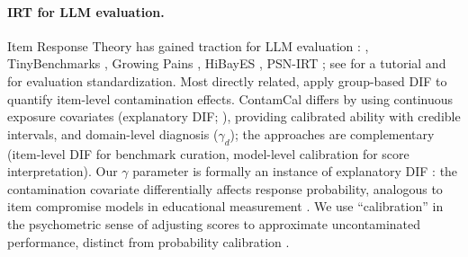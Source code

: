 \paragraph{IRT for LLM evaluation.}
Item Response Theory \citep{lord_1980_irt,hambleton_1991_irt} has gained traction for LLM evaluation \citep{liang_2023_helm}: \citet{rodriguez2021evaluation}, TinyBenchmarks \citep{polo_2024_tinybenchmarks}, Growing Pains \citep{habba_2025_growing_pains}, HiBayES \citep{luettgau_2025_hibayes}, PSN-IRT \citep{zhou_2025_psnirt}; see \citet{lalor_2024_irt_nlp} for a tutorial and \citet{gu2024olmes} for evaluation standardization. Most directly related, \citet{han2026quantifying} apply group-based DIF \citep{holland_1993_dif} to quantify item-level contamination effects. ContamCal differs by using continuous exposure covariates (explanatory DIF; \citealp{deboeck_2004_explanatory_irt}), providing calibrated ability with credible intervals, and domain-level diagnosis ($\gamma_d$); the approaches are complementary (item-level DIF for benchmark curation, model-level calibration for score interpretation). Our $\gamma$ parameter is formally an instance of explanatory DIF \citep{deboeck_2004_explanatory_irt,eckerly_2017_item_compromise}: the contamination covariate differentially affects response probability, analogous to item compromise models in educational measurement \citep{sinharay_2017_preknowledge,holland_1993_dif,camilli_1994_dif,swaminathan_1990_dif}. We use ``calibration'' in the psychometric sense of adjusting scores to approximate uncontaminated performance, distinct from probability calibration \citep{guo_2017_calibration}.
